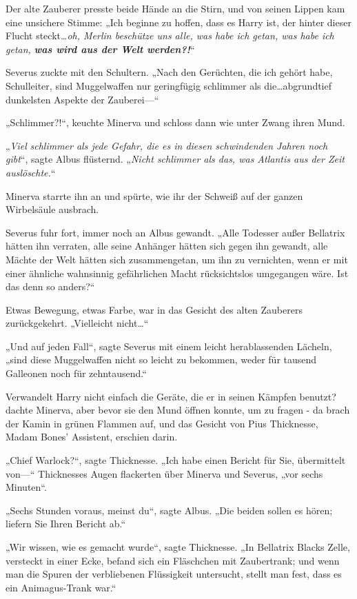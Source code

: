 {Der alte Zauberer presste beide Hände an die Stirn, und von seinen Lippen kam eine unsichere Stimme: „Ich beginne zu hoffen, dass es Harry ist, der hinter dieser Flucht steckt…\emph{oh, Merlin beschütze uns alle, was habe ich getan, was habe ich getan,} \textbf{\emph{was wird aus der Welt werden?!}}“

Severus zuckte mit den Schultern. „Nach den Gerüchten, die ich gehört habe, Schulleiter, sind Muggelwaffen nur geringfügig schlimmer als die…abgrundtief dunkelsten Aspekte der Zauberei—“

„Schlimmer?!“, keuchte Minerva und schloss dann wie unter Zwang ihren Mund.

„\emph{Viel} \emph{schlimmer als jede Gefahr, die es in diesen schwindenden Jahren noch gibt}“, sagte Albus flüsternd. „\emph{Nicht schlimmer als das, was Atlantis aus der Zeit auslöschte.}“

Minerva starrte ihn an und spürte, wie ihr der Schweiß auf der ganzen Wirbelsäule ausbrach.

Severus fuhr fort, immer noch an Albus gewandt. „Alle Todesser außer Bellatrix hätten ihn verraten, alle seine Anhänger hätten sich gegen ihn gewandt, alle Mächte der Welt hätten sich zusammengetan, um ihn zu vernichten, wenn er mit einer ähnliche wahnsinnig gefährlichen Macht rücksichtslos umgegangen wäre. Ist das denn so anders?“

Etwas Bewegung, etwas Farbe, war in das Gesicht des alten Zauberers zurückgekehrt. „Vielleicht nicht…“

„Und auf jeden Fall“, sagte Severus mit einem leicht herablassenden Lächeln, „sind diese Muggelwaffen nicht so leicht zu bekommen, weder für tausend Galleonen noch für zehntausend.“

Verwandelt Harry nicht einfach die Geräte, die er in seinen Kämpfen benutzt? dachte Minerva, aber bevor sie den Mund öffnen konnte, um zu fragen - da brach der Kamin in grünen Flammen auf, und das Gesicht von Pius Thicknesse, Madam Bones' Assistent, erschien darin.

„Chief Warlock?“, sagte Thicknesse. „Ich habe einen Bericht für Sie, übermittelt von—“ Thicknesses Augen flackerten über Minerva und Severus, „vor sechs Minuten“.

„Sechs Stunden voraus, meinst du“, sagte Albus. „Die beiden sollen es hören; liefern Sie Ihren Bericht ab.“

„Wir wissen, wie es gemacht wurde“, sagte Thicknesse. „In Bellatrix Blacks Zelle, versteckt in einer Ecke, befand sich ein Fläschchen mit Zaubertrank; und wenn man die Spuren der verbliebenen Flüssigkeit untersucht, stellt man fest, dass es ein Animagus-Trank war.“

}
